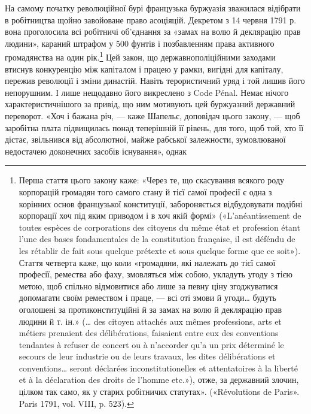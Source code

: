 На самому початку революційної бурі французька буржуазія
зважилася відібрати в робітництва щойно завойоване право
асоціяцій. Декретом з 14 червня 1791 р. вона проголосила всі
робітничі об’єднання за «замах на волю й деклярацію прав людини»,
караний штрафом у 500 фунтів і позбавленням права
активного громадянства на один рік.\footnote{
Перша стаття цього закону каже: «Через те, що скасування
всякого роду корпорацій громадян того самого стану й тієї самої професії
є одна з корінних основ французької конституції, забороняється відбудовувати
подібні корпорації хоч під яким приводом і в хоч якій формі»
(«L’anéantissement de toutes espèces de corporations des citoyens du même
état et profession étant l’une des bases fondamentales de la constitution
française, il est déféndu de les rétablir de fait sous quelque prétexte et
sous quelque forme que ce soit»). Стаття четверта каже, що коли «громадяни,
які належать до тієї самої професії, ремества або фаху, змовляться
між собою, укладуть угоду з тією метою, щоб спільно відмовитися
або лише за певну ціну згоджуватися допомагати своїм ремеством і праце,
— всі оті змови й угоди\dots{} будуть оголошені за протиконституційні
й за замах на волю й деклярацію прав людини й т. ін.» (\dots{} des citoyen
attachés aux mêmes professions, arts et métiers prenaient des délibérations,
faisaient entre eux des conventions tendantes à refuser de concert ou
à n’accorder qu’a un prix déterminé le secours de leur industrie ou de
leurs travaux, les dites délibérations et conventions\dots{} seront déclarées
inconstitutionelles et attentatoires à la liberté et à la déclaration des
droits de l’homme etc.»), отже, за державний злочин, цілком так само,
як у старих робітничих статутах». («Révolutions de Paris». Paris 1791,
vol. VIII, p. 523).
} Цей закон, що державнополіційними
заходами втиснув конкуренцію між капіталом і
працею у рамки, вигідні для капіталу, пережив революції і зміни
династій. Навіть терористичний уряд і той лишив його непорушним.
І лише нещодавно його викреслено з Code Pénal. Немає
нічого характеристичнішого за привід, що ним мотивують
цей буржуазний державний переворот. «Хоч і бажана річ, —
каже Шапельє, доповідач цього закону, — щоб заробітна плата підвищилась
понад теперішній її рівень, для того, щоб той, хто її
дістає, звільнився від абсолютної, майже рабської залежности,
зумовлюваної недостачею доконечних засобів існування», однак
\parbreak{}  %
